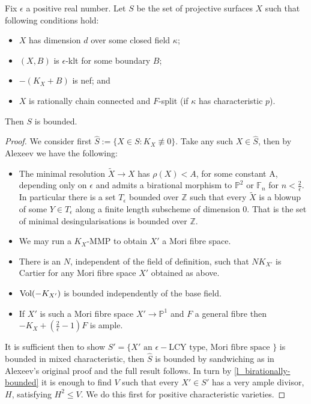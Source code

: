 \begin{theorem}\label{SBAB}
	Fix $\epsilon$ a positive real number. Let $S$ be the set of projective surfaces $X$ such that following conditions hold:
	\begin{itemize}
		\item $X$ has dimension $d$ over some closed field $\kappa$;
		\item $(X,B)$ is $\epsilon$-klt for some boundary $B$;
		\item $-(K_{X}+B)$ is nef; and
		\item $X$ is rationally chain connected and $F$-split (if $\kappa$ has characteristic $p$).
	\end{itemize}
	Then $S$ is bounded.
\end{theorem}
\begin{proof}
	We consider first $\hat{S}:=\{X \in S\colon  K_{X} \not\equiv 0\}$. Take any such $X \in \hat{S}$, then by Alexeev \cite[Chapter 6]{alexeev1994boundedness} we have the following:
	\begin{itemize}
		\item The minimal resolution $\tilde{X}\to X$ has $\rho(X) < A $, for some constant A, depending only on $\epsilon$ and admits a birational morphism to $\mathbb{P}^{2}$ or $\mathbb{F}_{n}$ for $n < \frac{2}{\epsilon}$. In particular there is a set $T_{\epsilon}$ bounded over $\mathbb{Z}$ such that every $\tilde{X}$ is a blowup of some $Y \in T_{\epsilon}$ along a finite length subscheme of dimension $0$. That is the set of minimal desingularisations is bounded over $\mathbb{Z}$.
		\item We may run a $K_{X}$-MMP to obtain $X'$ a Mori fibre space. 
		\item There is an $N$, independent of the field of definition, such that $NK_{X'}$ is Cartier for any Mori fibre space $X'$ obtained as above.
		\item $\text{Vol}(-K_{X'})$ is bounded independently of the base field.
		\item If $X'$ is such a Mori fibre space $X' \to \mathbb{P}^{1}$ and $F$ a general fibre then $-K_{X} +(\frac{2}{\epsilon}-1)F$ is ample.
	\end{itemize}
	
	It is sufficient then to show $S'=\{X' \text{ an } \epsilon-\text{LCY type, Mori fibre space }\}$ is bounded in mixed characteristic, then $\hat{S}$ is bounded by sandwiching as in Alexeev's original proof and the full result follows. In turn by \autoref{l_birationally-bounded} it is enough to find $V$ such that every $X' \in S'$ has a very ample divisor, $H$, satisfying $H^{2}\leq V$. We do this first for positive characteristic varieties.
	

\end{proof}
